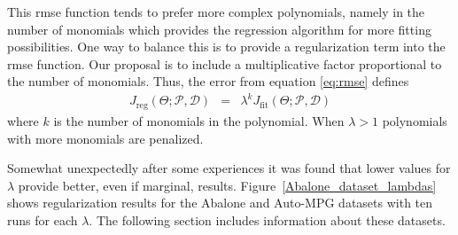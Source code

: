 \documentclass{elsarticle}
\begin{document}
This \ac{rmse} function tends to prefer more complex polynomials, namely in the number of monomials which provides the regression algorithm for more fitting possibilities. One way to balance this is to provide a regularization term into the \ac{rmse} function. Our proposal is to include a multiplicative factor proportional to the number of monomials. Thus, the error from equation \ref{eq:rmse} defines
\begin{eqnarray}
J_{\textrm{reg}}\left(\Theta;\mathcal{P},\mathcal{D}\right) &=& \lambda^{k} J_{\textrm{fit}}\left(\Theta;\mathcal{P},\mathcal{D}\right)\label{eq:rmse-reg}
\end{eqnarray}
%
where $k$ is the number of monomials in the polynomial. When $\lambda > 1$ polynomials with more monomials are penalized.

Somewhat unexpectedly after some experiences it was found that lower values for $\lambda$ provide better, even if marginal, results. Figure~\ref{Abalone_dataset_lambdas} shows regularization results for the Abalone and Auto-MPG datasets with ten runs for each $\lambda$. The following section  includes information about these datasets.
\end{document}
